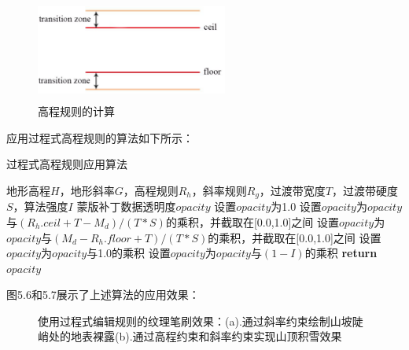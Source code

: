 \begin{figure}[H]
    \centering
    \includegraphics[height=3.4cm ,width=6.3cm]{figures/trans.png}
    \caption{高程规则的计算}
 \end{figure}
应用过程式高程规则的算法如下所示：\par
 \begin{algorithm}[H]
	\renewcommand{\algorithmicrequire}{\textbf{Input:}}
	\renewcommand{\algorithmicensure}{\textbf{Output:}}
	\caption{过程式高程规则应用算法}
	\label{alg:1}
	\begin{algorithmic}[1]
		\REQUIRE 地形高程$H$，地形斜率$G$，高程规则$R_h$，斜率规则$R_g$，过渡带宽度$T$，过渡带硬度$S$，算法强度$I$
		\ENSURE 蒙版补丁数据透明度$opacity$
		\STATE 设置$opacity$为1.0
	    \STATE 设置$opacity$为$opacity$与$(R_h.ceil+T-M_d)/(T*S)$的乘积，并截取在[0.0,1.0]之间
	    \ELSE 
	    \STATE 设置$opacity$为$opacity$与$(M_d-R_h.floor+T)/(T*S)$的乘积，并截取在[0.0,1.0]之间
		\ENDIF
	    \STATE 设置$opacity$为$opacity$与1.0的乘积
	    \ELSE 
	    \STATE 设置$opacity$为$opacity$与$(1-I)$的乘积
		\ENDIF
		\STATE \textbf{return} $opacity$
	\end{algorithmic}  
\end{algorithm}
图5.6和5.7展示了上述算法的应用效果：
\begin{figure}[H]
    \centering
  \caption{使用过程式编辑规则的纹理笔刷效果：(a).通过斜率约束绘制山坡陡峭处的地表裸露(b).通过高程约束和斜率约束实现山顶积雪效果}
\end{figure}
  
